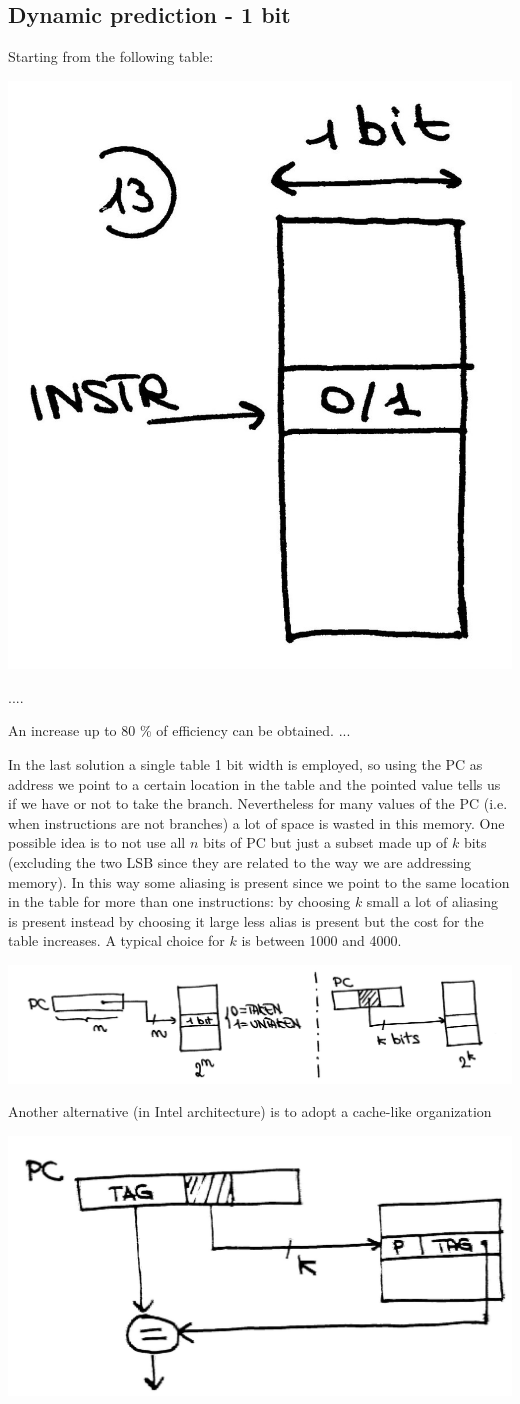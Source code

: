 \subsection{Dynamic prediction - 1 bit}
Starting from the following table:

\begin{center}
  \includegraphics[width=0.3\linewidth]{img/img3/13}
\end{center}
....

An increase up to 80 \% of efficiency can be obtained.
...

In the last solution a single table 1 bit width is employed, so using the PC as
address we point to a certain location in the table and the pointed value tells
us if we have or not to take the branch. Nevertheless for many values of the PC
(i.e. when instructions are not branches) a lot of space is wasted in this
memory. One possible idea is to not use all $n$ bits of PC but just a subset
made up of $k$ bits (excluding the two LSB since they are related to the way we
are addressing memory). In this way some aliasing is present since we point to
the same location in the table for more than one instructions: by choosing $k$
small a lot of aliasing is present instead by choosing it large less alias is
present but the cost for the table increases. A typical choice for $k$ is
between 1000 and 4000.

\begin{center}
  \includegraphics[width=0.75\linewidth]{img/img3/15}
\end{center}

Another alternative (in Intel architecture) is to adopt a cache-like
organization

\begin{center}
  \includegraphics[width=0.6\linewidth]{img/img3/16}
\end{center}

